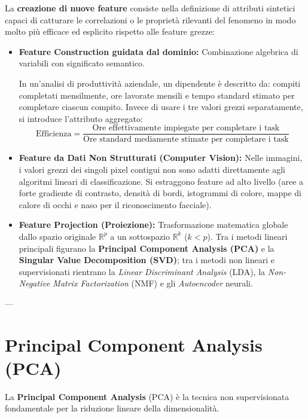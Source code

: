 La \textbf{creazione di nuove feature} consiste nella definizione di attributi sintetici capaci di catturare le correlazioni o le proprietà rilevanti del fenomeno in modo molto più efficace ed esplicito rispetto alle feature grezze:

\begin{itemize}
    \item \textbf{Feature Construction guidata dal dominio:} Combinazione algebrica di variabili con significato semantico.
    \begin{example}
    In un'analisi di produttività aziendale, un dipendente è descritto da: compiti completati mensilmente, ore lavorate mensili e tempo standard stimato per completare ciascun compito. Invece di usare i tre valori grezzi separatamente, si introduce l'attributo aggregato:
    \begin{equation}
    \text{Efficienza} = \frac{\text{Ore effettivamente impiegate per completare i task}}{\text{Ore standard mediamente stimate per completare i task}}
    \end{equation}
    \end{example}
    \item \textbf{Feature da Dati Non Strutturati (Computer Vision):} Nelle immagini, i valori grezzi dei singoli pixel contigui non sono adatti direttamente agli algoritmi lineari di classificazione. Si estraggono feature ad alto livello (aree a forte gradiente di contrasto, densità di bordi, istogrammi di colore, mappe di calore di occhi e naso per il riconoscimento facciale).
    \item \textbf{Feature Projection (Proiezione):} Trasformazione matematica globale dallo spazio originale $\mathbb{R}^p$ a un sottospazio $\mathbb{R}^k$ ($k < p$). Tra i metodi lineari principali figurano la \textbf{Principal Component Analysis (PCA)} e la \textbf{Singular Value Decomposition (SVD)}; tra i metodi non lineari e supervisionati rientrano la \textit{Linear Discriminant Analysis} (LDA), la \textit{Non-Negative Matrix Factorization} (NMF) e gli \textit{Autoencoder} neurali.
\end{itemize}

---

\section{Principal Component Analysis (PCA)}

La \textbf{Principal Component Analysis} (PCA) è la tecnica non supervisionata fondamentale per la riduzione lineare della dimensionalità.

